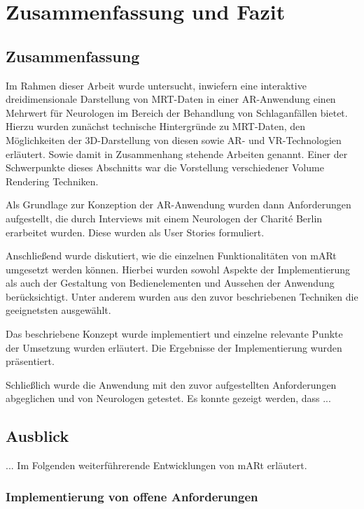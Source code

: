 
\chapter{Zusammenfassung und Fazit}
\label{fazit}

\section{Zusammenfassung}

Im Rahmen dieser Arbeit wurde untersucht, inwiefern eine interaktive dreidimensionale Darstellung von MRT-Daten in einer AR-Anwendung einen Mehrwert für Neurologen im Bereich der Behandlung von Schlaganfällen bietet. 
Hierzu wurden zunächst technische Hintergründe zu MRT-Daten, den Möglichkeiten der 3D-Darstellung von diesen sowie AR- und VR-Technologien erläutert. Sowie damit in Zusammenhang stehende Arbeiten genannt. Einer der Schwerpunkte dieses Abschnitts war die Vorstellung verschiedener Volume Rendering Techniken.

Als Grundlage zur Konzeption der AR-Anwendung wurden dann Anforderungen aufgestellt, die durch Interviews mit einem Neurologen der Charité Berlin erarbeitet wurden. Diese wurden als User Stories formuliert.

Anschließend wurde diskutiert, wie die einzelnen Funktionalitäten von mARt umgesetzt werden können. Hierbei wurden sowohl Aspekte der Implementierung als auch der Gestaltung von Bedienelementen und Aussehen der Anwendung berücksichtigt. Unter anderem wurden aus den zuvor beschriebenen Techniken die geeignetsten ausgewählt. 

Das beschriebene Konzept wurde implementiert und einzelne relevante Punkte der Umsetzung wurden erläutert. Die Ergebnisse der Implementierung wurden präsentiert.

Schließlich wurde die Anwendung mit den zuvor aufgestellten Anforderungen abgeglichen und von Neurologen getestet. 
Es konnte gezeigt werden, dass ...

\section{Ausblick}

...
Im Folgenden weiterführerende Entwicklungen von mARt erläutert.

\subsection{Implementierung von offene  Anforderungen}

